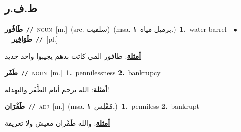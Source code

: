 \documentclass[10pt,a4paper,twoside]{article} %
\begin{document}
\begin{multicols}{2}
\vspace{-3mm}
\subsection*{\color{blue}\foreignlanguage{arabic}{ط.ف.ر}\color{blue}{}} 

{\setlength\topsep{0pt}\textbf{\foreignlanguage{arabic}{طَافُور}}\ {\color{gray}\texttt{//}\color{black}}\ \textsc{noun}\ [m.]\ (src. \color{gray}\foreignlanguage{arabic}{سلفيت}\color{black})\ \color{gray}(msa. \foreignlanguage{arabic}{برميل مياه}~\foreignlanguage{arabic}{\textbf{١.}})\color{black}\ \textbf{1.}~water barrel\ \ $\bullet$\ \ \setlength\topsep{0pt}\textbf{\foreignlanguage{arabic}{طَوَافِير}}\ {\color{gray}\texttt{//}\color{black}}\ [pl.]\  \begin{flushright}\color{gray}\foreignlanguage{arabic}{\textbf{\underline{\foreignlanguage{arabic}{أمثلة}}}: طافور المي كاتت بدهم يجيبوا واحد جديد}\end{flushright}\color{black}} \vspace{2mm}

{\setlength\topsep{0pt}\textbf{\foreignlanguage{arabic}{طَفَر}}\ {\color{gray}\texttt{//}\color{black}}\ \textsc{noun}\ [m.]\ \textbf{1.}~pennilessness  \textbf{2.}~bankrupcy\  \begin{flushright}\color{gray}\foreignlanguage{arabic}{\textbf{\underline{\foreignlanguage{arabic}{أمثلة}}}: الله يرحم أيام الطَّفَر والبهدلة!}\end{flushright}\color{black}} \vspace{2mm}

{\setlength\topsep{0pt}\textbf{\foreignlanguage{arabic}{طَفْرَان}}\ {\color{gray}\texttt{//}\color{black}}\ \textsc{adj}\ [m.]\ \color{gray}(msa. \foreignlanguage{arabic}{مُفْلِس}~\foreignlanguage{arabic}{\textbf{١.}})\color{black}\ \textbf{1.}~penniless  \textbf{2.}~bankrupt\  \begin{flushright}\color{gray}\foreignlanguage{arabic}{\textbf{\underline{\foreignlanguage{arabic}{أمثلة}}}: والله طَفْران معيش ولا تعريفة}\end{flushright}\color{black}} \vspace{2mm}


\end{multicols}
\end{document}
